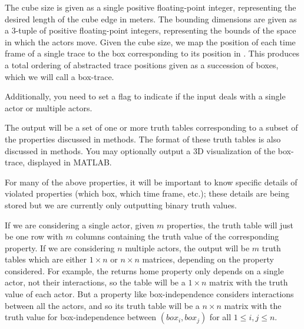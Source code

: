 The cube size is given as a single positive floating-point integer, representing the desired length of the cube edge in meters.
The bounding dimensions are given as a 3-tuple of positive floating-point integers, representing the bounds of the space in which the actors move.
Given the cube size, we map the position of each time frame of a single trace to the box corresponding to its position in \rthree.
 This produces a total ordering of abstracted trace positions given as a succession of boxes, which we will call a box-trace.
 
 Additionally, you need to set a flag to indicate if the input deals with a single actor or multiple actors.
 
 
 The output will be a set of one or more truth tables corresponding to a subset of the properties discussed in methods.
 The format of these truth tables is also discussed in methods.
 You may optionally output a 3D visualization of the box-trace, displayed in MATLAB.
 
 For many of the above properties, it will be important to know specific details of violated properties (which box, which time frame, etc.); these details are being stored but we are currently only outputting binary truth values. 
 
 If we are considering a single actor, given $m$ properties, the truth table will just be one row with $m$ columns containing the truth value of the corresponding property.
 If we are considering $n$ multiple actors, the output will be $m$ truth tables which are either $1 \times n$ or $n \times n$ matrices, depending on the property considered.
 For example, the returns home property only depends on a single actor, not their interactions, so the table will be a $1 \times n$ matrix with the truth value of each actor.
 But a property like box-independence considers interactions between all the actors, and so its truth table will be a $n \times n$ matrix with the truth value for box-independence between $(box_i,box_j)$ for all $1 \leq i,j \leq n$.


